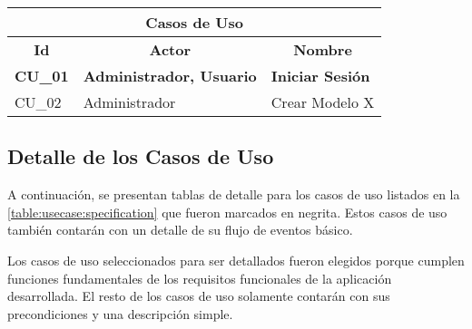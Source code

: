 \begin{center}
  \begin{tabular}{| p{1.5cm} | p{6.5cm} | p{5.5cm} |}
    \hline
    \multicolumn{3}{|c|}{\textbf{Casos de Uso}} \\
    \hline
    \multicolumn{1}{|c|}{\textbf{Id}} & \multicolumn{1}{|c|}{\textbf{Actor}} & \multicolumn{1}{|c|}{\textbf{Nombre}}\\
    \hline
    
    {\textbf{CU\_01}} & \textbf{Administrador, Usuario} & \textbf{Iniciar Sesión}\\ \hline
    
    {CU\_02} & {Administrador} & {Crear Modelo X}\\ \hline
  \end{tabular}
  
  \label{table:usecase:specification}
\end{center}

\subsection{Detalle de los Casos de Uso}
A continuación, se presentan tablas de detalle para los casos de uso listados en la \autoref{table:usecase:specification} que fueron marcados en negrita. Estos casos de uso también contarán con un detalle de su flujo de eventos básico.

Los casos de uso seleccionados para ser detallados fueron elegidos porque cumplen funciones fundamentales de los requisitos funcionales de la aplicación desarrollada. El resto de los casos de uso solamente contarán con sus precondiciones y una descripción simple.

%
%

